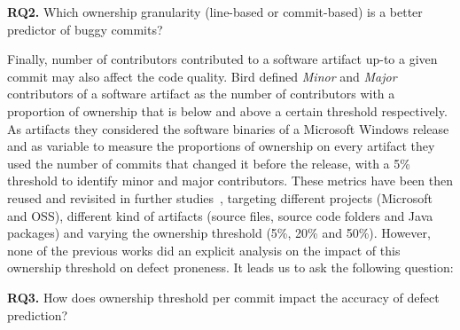 \textbf{RQ2.} Which ownership granularity (line-based or commit-based) is a better predictor of buggy commits?

Finally, number of contributors contributed to a software artifact up-to a given commit may also affect the code quality. Bird \etal defined \textit{Minor} and \textit{Major} contributors of a software artifact as the number of contributors with a proportion of ownership that is below and above a certain threshold respectively. As artifacts they considered the software binaries of a Microsoft Windows release and as variable to measure the proportions of ownership on every artifact they used the number of commits that changed it before the release, with a 5\% threshold to identify minor and major contributors.
These metrics have been then reused and revisited in further studies~\cite{Foucault:oss, Greiler:replication}, targeting different projects (Microsoft and OSS), different kind of artifacts (source files, source code folders and Java packages) and varying the ownership threshold (5\%, 20\% and 50\%). However, none of the previous works did an explicit analysis on the impact of this ownership threshold on defect proneness. It leads us to ask the following question:

\textbf{RQ3.} How does ownership threshold per commit impact the accuracy of defect prediction?
